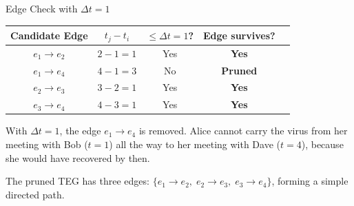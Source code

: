 \begin{examplebox}{Edge Check with $\Delta t = 1$}
\begin{center}
\begin{tabular}{ccccc}
\toprule
\textbf{Candidate Edge} & $t_j - t_i$ & $\le \Delta t = 1$? & \textbf{Edge survives?} \\
\midrule
$e_1 \to e_2$ & $2-1=1$ & Yes & \textbf{Yes} \\
$e_1 \to e_4$ & $4-1=3$ & No  & \textbf{Pruned} \\
$e_2 \to e_3$ & $3-2=1$ & Yes & \textbf{Yes} \\
$e_3 \to e_4$ & $4-3=1$ & Yes & \textbf{Yes} \\
\bottomrule
\end{tabular}
\end{center}

\medskip
With $\Delta t = 1$, the edge $e_1 \to e_4$ is removed. Alice cannot carry
the virus from her meeting with Bob ($t=1$) all the way to her meeting with
Dave ($t=4$), because she would have recovered by then.

The pruned TEG has three edges: $\{e_1 \to e_2,\; e_2 \to e_3,\; e_3 \to
e_4\}$, forming a simple directed path.
\end{examplebox}

